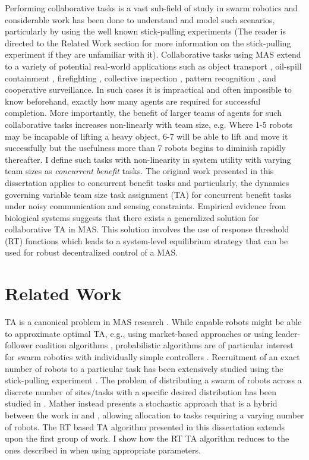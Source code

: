 \documentclass[12pt]{book}
\begin{document}
Performing collaborative tasks is a vast sub-field of study in swarm robotics and considerable work has been done to understand and model such scenarios, particularly by \cite{Martinoli1995, Martinoli1999b, Agassounon2001, Ijspeert2001, Agassounon2002} using the well known stick-pulling experiments (The reader is directed to the Related Work section for more information on the stick-pulling experiment if they are unfamiliar with it). Collaborative tasks using MAS extend to a variety of potential real-world applications such as object transport \cite{Sugawara2012}, oil-spill containment \cite{Beni2005}, firefighting \cite{Kanakia2014}, collective inspection \cite{Correll2007}, pattern recognition \cite{Beni1993}, and cooperative surveillance. In such cases it is impractical and often impossible to know beforehand, exactly how many agents are required for successful completion. More importantly, the benefit of larger teams of agents for such collaborative tasks increases non-linearly with team size, e.g. Where 1-5 robots may be incapable of lifting a heavy object, 6-7 will be able to lift and move it successfully but the usefulness more than 7 robots begins to diminish rapidly thereafter. I define such tasks with non-linearity in system utility with varying team sizes as \emph{concurrent benefit} tasks. The original work presented in this dissertation applies to concurrent benefit tasks and particularly, the dynamics governing variable team size task assignment (TA) for concurrent benefit tasks under noisy communication and sensing constraints. Empirical evidence from biological systems suggests that there exists a generalized solution for collaborative TA in MAS. This solution involves the use of response threshold (RT) functions which leads to a system-level equilibrium strategy that can be used for robust decentralized control of a MAS.

\section{Related Work}\label{sec:relwork}
TA is a canonical problem in MAS research \cite{Gerkey2004}. While capable robots might be able to approximate optimal TA, e.g., using market-based approaches \cite{Amstutz2008,Vig2007} or using  leader-follower coalition algorithms \cite{Chen2011}, probabilistic algorithms are of particular interest for swarm robotics with individually simple controllers \cite{Dantu2012}. Recruitment of an exact number of robots to a particular task has been extensively studied using the stick-pulling experiment \cite{Lerman2001,Martinoli2004}. The problem of distributing a swarm of robots across a discrete number of sites/tasks with a specific desired distribution has been studied in \cite{Berman2009,Correll2008}. Mather \cite{Mather2010} instead presents a stochastic approach that is a hybrid between the work in \cite{Berman2009} and \cite{Martinoli2004}, allowing allocation to tasks requiring a varying number of robots. The RT based TA algorithm presented in this dissertation extends upon the first group of work. I show how the RT TA algorithm reduces to the ones described in \cite{Lerman2001,Martinoli2004} when using appropriate parameters. 
\end{document}
